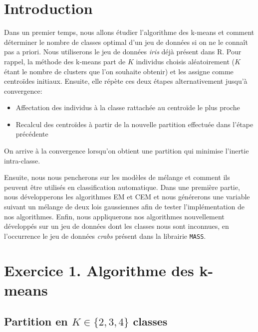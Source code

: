 \documentclass{article}
\begin{document}
\begin{multicols}{2}

\section{Introduction}\label{sec:intro}

Dans un premier temps, nous allons étudier l'algorithme des k-means et comment
déterminer le nombre de classes optimal d'un jeu de données si on ne le connaît
pas a priori. Nous utiliserons le jeu de données \emph{iris} déjà présent dans
R. Pour rappel, la méthode des k-means part de $K$ individus choisis
aléatoirement ($K$ étant le nombre de clusters que l'on souhaite obtenir) et les
assigne comme centroïdes initiaux. Ensuite, elle répète ces deux étapes
alternativement jusqu'à convergence:
\begin{itemize}
    \item Affectation des individus à la classe rattachée au centroïde le plus
        proche
    \item Recalcul des centroïdes à partir de la nouvelle partition effectuée
        dans l'étape précédente
\end{itemize}
On arrive à la convergence lorsqu'on obtient une partition qui minimise
l'inertie intra-classe.

Ensuite, nous nous pencherons sur les modèles de mélange et comment ils peuvent
être utilisés en classification automatique.
Dans une première partie, nous développerons les algorithmes EM et CEM et nous
générerons une variable suivant un mélange de deux lois gaussiennes afin de
tester l'implémentation de nos algorithmes.
Enfin, nous appliquerons nos algorithmes nouvellement développés sur un jeu de
données dont les classes nous sont inconnues, en l'occurrence le jeu de données
\emph{crabs} présent dans la librairie \texttt{MASS}.


\section{Exercice 1. Algorithme des k-means}\label{sec:ex1}

\subsection{Partition en $K \in \{ 2, 3, 4 \}$ classes}\label{subsec:parts}


\end{multicols}
\end{document}
